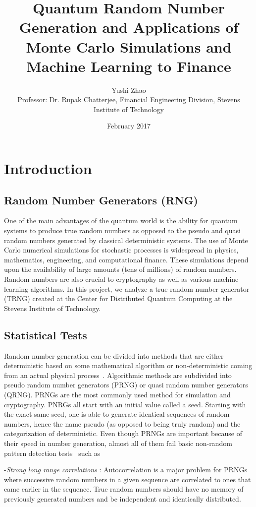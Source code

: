 \documentclass{article}
\title{Quantum Random Number Generation and Applications of Monte Carlo Simulations and Machine Learning to Finance}
\author{Yushi Zhao\\Professor: Dr. Rupak Chatterjee, Financial Engineering Division, Stevens Institute of Technology}
\date{February 2017}
\begin{document}
\maketitle

\section{Introduction}

    \subsection{Random Number Generators (RNG)}
    One of the main advantages of the quantum world is the ability for quantum systems to
produce true random numbers as opposed to the pseudo and quasi random numbers generated
by classical deterministic systems. The use of Monte Carlo numerical simulations for
stochastic processes is widespread in physics, mathematics, engineering, and computational
finance. These simulations depend upon the availability of large amounts (tens of millions)
of random numbers. Random numbers are also crucial to cryptography as well as various machine learning algorithms. In this project, we analyze a true random number generator (TRNG) created at the Center for Distributed Quantum Computing at the Stevens Institute of Technology.

    \subsection{Statistical Tests}
    Random number generation can be divided into methods that are either deterministic
based on some mathematical algorithm or non-deterministic coming from an actual physical
process~\citep{haahr1999introduction}. Algorithmic methods are subdivided into pseudo random number generators
(PRNG) or quasi random number generators (QRNG). PRNGs are the most commonly used
method for simulation and cryptography. PNRGs all start with an initial value called a seed. Starting with the exact same seed, one is able to generate identical sequences of random numbers, hence the name pseudo (as opposed to
being truly random) and the categorization of deterministic. Even though PRNGs are important
because of their speed in number generation, almost all of them fail basic non-random
pattern detection tests~\citep{sen2006quasi} such as

-\textit{Strong long range correlations} : Autocorrelation is a major problem for PRNGs where successive random numbers in a given sequence are correlated to ones that came earlier in the sequence. True random numbers should have no memory of previously generated numbers
and be independent and identically distributed.
\end{document}

